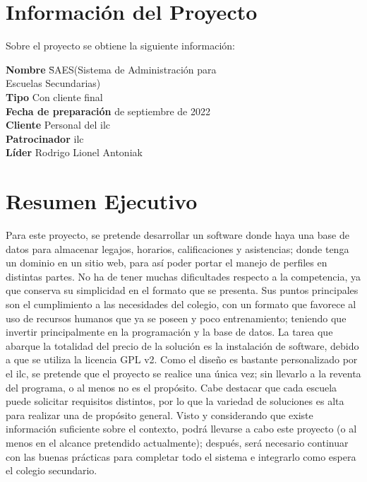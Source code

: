 \section[Información]{Información del Proyecto}
\normalsize{ \indent
Sobre el proyecto se obtiene la siguiente información:
}
\begin{tabbing}
  \hspace{1cm}\= \textbf{Nombre}\qquad \qquad \qquad
  \quad \quad \= SAES(Sistema de Administración para
  \\[5pt] \> \> \qquad \quad Escuelas Secundarias) \\[5pt] \>
  \textbf{Tipo} \> Con cliente final\\[5pt] \>
  \textbf{Fecha de preparación}  de septiembre de 2022\\[5pt] \>
  \textbf{Cliente} \> Personal del \acrlong{ilc}
  \\[5pt] \> \textbf{Patrocinador} \> \acrlong{ilc}
  \\[5pt] \> \textbf{Líder} \> Rodrigo Lionel Antoniak
\end{tabbing}
\section[Resumen]{Resumen Ejecutivo}
\normalsize{ \indent
Para este proyecto, se pretende desarrollar un
software donde haya una base de datos para almacenar
legajos, horarios, calificaciones y asistencias;
donde tenga un dominio en un sitio web, para así
poder portar el manejo de perfiles en distintas
partes. No ha de tener muchas dificultades respecto
a la competencia, ya que conserva su simplicidad en
el formato que se presenta.
}
\newline
\normalsize{ \indent
Sus puntos principales son el cumplimiento a las
necesidades del colegio, con un formato que favorece
al uso de recursos humanos que ya se poseen y poco
entrenamiento; teniendo que invertir principalmente en
la programación y la base de datos. La tarea que abarque
la totalidad del precio de la solución es la instalación
de software, debido a que se utiliza la licencia GPL v2.
}
\newline
\normalsize{ \indent
Como el diseño es bastante personalizado por el
\acrlong{ilc}, se pretende que el proyecto se realice una
única vez; sin llevarlo a la reventa del programa, o al
menos no es el propósito. Cabe destacar que cada escuela
puede solicitar requisitos distintos, por lo que la
variedad de soluciones es alta para realizar una de
propósito general.
}
\newline
\normalsize{ \indent
Visto y considerando que existe información suficiente
sobre el contexto, podrá llevarse a cabo este proyecto
(o al menos en el alcance pretendido actualmente);
después, será necesario continuar con las buenas prácticas
para completar todo el sistema e integrarlo como espera
el colegio secundario.
}

